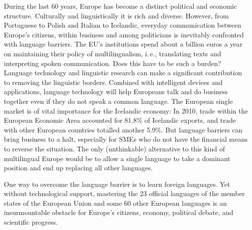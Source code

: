 \documentclass{../../metanetpaper}
\begin{document}

\setcounter{section}{0}
\setcounter{figure}{0}

\cleardoublepage



\begin{multicols}{2}

During the last 60 years, Europe has become a distinct political and economic structure. Culturally and linguistically it is rich and diverse. However, from Portuguese to Polish and Italian to Icelandic, everyday communication between Europe’s citizens, within business and among politicians is inevitably confronted with language barriers. The EU's institutions spend about a billion euros a year on maintaining their policy of multilingualism, i.\,e., translating texts and interpreting spoken communication. Does this have to be such a burden? Language technology and linguistic research can make a significant contribution to removing the linguistic borders. Combined with intelligent devices and applications, language technology will help Europeans talk and do business together even if they do not speak a common language.  The European single market is of vital importance for the Icelandic economy: In 2010, trade within the European Economic Area accounted for 81.8\% of Icelandic exports, and trade with other European countries totalled another 5.9\%\cite{hag3}. But language barriers can bring business to a halt, especially for SMEs who do not have the financial means to reverse the situation. The only (unthinkable) alternative to this kind of multilingual Europe would be to allow a single language to take a dominant position and end up replacing all other languages.

One way to overcome the language barrier is to learn foreign languages. Yet without technological support, mastering the 23 official languages of the member states of the European Union and some 60 other European languages is an insurmountable obstacle for Europe’s citizens, economy, political debate, and scientific progress. 


\end{multicols}
\end{document}
